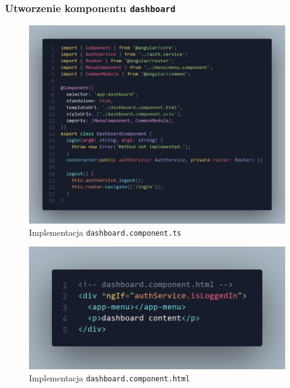 \documentclass[12pt]{article}
\begin{document}
\subsubsection{Utworzenie komponentu \texttt{dashboard}}
\begin{figure}[H]
  \centering
  \includegraphics[width=1\textwidth,keepaspectratio]{image-11.png}
  \caption{Implementacja \texttt{dashboard.component.ts}}
  \label{fig:image-11}
\end{figure}
\begin{figure}[H]
  \centering
  \includegraphics[width=1\textwidth,keepaspectratio]{image-12.png}
  \caption{Implementacja \texttt{dashboard.component.html}}
  \label{fig:image-12}
\end{figure}
\end{document}
